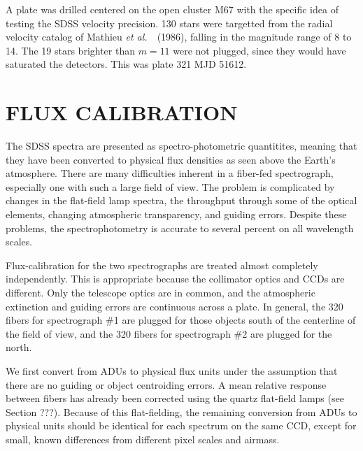 \documentclass[12pt,preprint]{aastex}
\newcommand{\etal}{{\it et al.}~}
\newcommand{\ergs}{{\rm ~erg~s}^{-1}}
\newcommand{\ergscmang}{{\rm ~erg~s}^{-1}{\rm cm}^{-2}{\rm\AA}^{-1}}
\begin{document}

A plate was drilled centered on the open cluster M67 with the
specific idea of testing the SDSS velocity precision.
130 stars were targetted from the radial velocity catalog
of Mathieu \etal\ (1986), falling in the magnitude range of 8 to 14.
The 19 stars brighter than $m=11$ were not plugged, since they
would have saturated the detectors.  This was plate 321 MJD 51612.

\section{FLUX CALIBRATION}
\label{sec_fluxing}

The SDSS spectra are presented as spectro-photometric quantitites,
meaning that they have been converted to physical flux densities
as seen above the Earth's atmosphere.
There are many difficulties inherent in a fiber-fed spectrograph,
especially one with such a large field of view.
The problem is complicated by changes in the flat-field lamp spectra,
the throughput through some of the optical elements, changing
atmospheric transparency, and guiding errors.
Despite these problems, the spectrophotometry is accurate to
several percent on all wavelength scales.

Flux-calibration for the two spectrographs are treated almost completely
independently.  This is appropriate because the collimator optics
and CCDs are different.  Only the telescope optics are in common, and the
atmospheric extinction and guiding errors are continuous across a plate.
In general, the 320 fibers for spectrograph \#1 are plugged for those
objects south of the centerline of the field of view, and the 320 fibers
for spectrograph \#2 are plugged for the north.


We first convert from ADUs to physical flux units under the
assumption that there are no guiding or object centroiding errors.
A mean relative response between fibers has already been corrected
using the quartz flat-field lamps (see Section ???).
Because of this flat-fielding, the remaining conversion from ADUs
to physical units should be identical for each spectrum on the 
same CCD, except for small, known differences from different pixel scales
and airmass.
\end{document}
